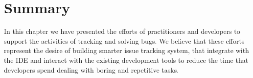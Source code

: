 
\section{Summary}

In this chapter we have presented the efforts of practitioners and developers to support the activities of tracking and solving bugs.
We believe that these efforts represent the desire of building smarter issue tracking system, that integrate with the IDE and interact with the existing development tools to reduce the time that developers spend dealing with boring and repetitive tasks.
